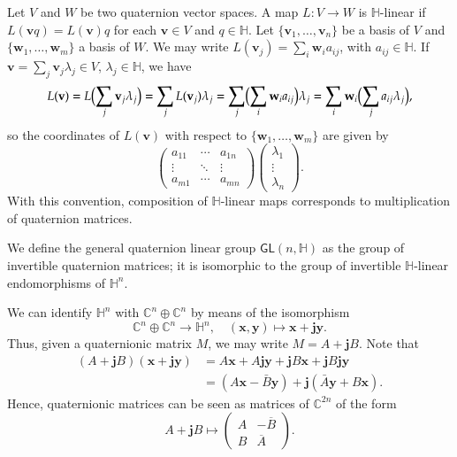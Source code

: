 \documentclass[12pt, a4paper]{amsart}
\newcommand{\C}{\mathbb{C}}
\renewcommand{\H}{\mathbb{H}}
\theoremstyle{remark}
\begin{document}
Let $V$ and $W$ be two quaternion vector spaces. 
A map $L\colon V\to W$ is $\H$-linear if $L(\mathbf{v}q)=L(\mathbf{v})q$ for each $\mathbf{v}\in V$ and $q\in\H$. Let $\{\mathbf{v}_1,\dots,\mathbf{v}_n\}$ be a basis of $V$ and $\{\mathbf{w}_1,\dots,\mathbf{w}_m\}$ a basis of $W$. 
We may write $L(\mathbf{v}_j)=\sum_i \mathbf{w}_i a_{ij}$, with $a_{ij}\in\H$. 
If $\mathbf{v}=\sum_j \mathbf{v}_j\lambda_j\in V$, $\lambda_j\in\H$, we have 
\[
L(\mathbf{v})
=L\Bigl(\sum_j \mathbf{v}_j\lambda_j\Bigr)
=\sum_j L(\mathbf{v}_j)\lambda_j{}=\sum_j\Bigl(\sum_i \mathbf{w}_i a_{ij}\Bigr)\lambda_j
=\sum_{i}\mathbf{w}_i\Bigl(\sum_j a_{ij}\lambda_j\Bigr),
\]
so the coordinates of $L(\mathbf{v})$ with respect to $\{\mathbf{w}_1,\dots,\mathbf{w}_m\}$ are given by
\[
\begin{pmatrix}
a_{11} & \cdots & a_{1n}\\
\vdots & \ddots & \vdots\\
a_{m1} & \cdots & a_{mn}
\end{pmatrix}
\begin{pmatrix}
\lambda_1\\
\vdots\\
\lambda_n
\end{pmatrix}.
\]
With this convention, composition of $\H$-linear maps corresponds to multiplication of quaternion matrices.

We define the general quaternion linear group $\mathsf{GL}(n,\H)$ as the group of invertible quaternion matrices; it is isomorphic to the group of invertible $\H$-linear endomorphisms of $\H^n$. 

We can identify $\H^n$ with $\C^n\oplus\C^n$ by means of the isomorphism
\[
\C^n\oplus\C^n\to\H^n,\quad (\mathbf{x},\mathbf{y})\mapsto \mathbf{x}+\mathbf{j}\mathbf{y}.
\]
Thus, given a quaternionic matrix $M$, we may write $M=A+\mathbf{j}B$.
Note that
\[
\begin{aligned}
(A+\mathbf{j}B)(\mathbf{x}+\mathbf{j}\mathbf{y})
&{}=A\mathbf{x}+A\mathbf{j}\mathbf{y}
+\mathbf{j}B\mathbf{x}+\mathbf{j}B\mathbf{j}\mathbf{y}\\
&{}=(A\mathbf{x}-\bar{B}\mathbf{y})
+\mathbf{j}(\bar{A}\mathbf{y}+B\mathbf{x}).
\end{aligned}
\]
Hence, quaternionic matrices can be seen as matrices of $\C^{2n}$ of the form
\[
A+\mathbf{j}B\mapsto
\begin{pmatrix}
A & -\overline{B}\\
B & \overline{A}
\end{pmatrix}.
\]
\end{document}
